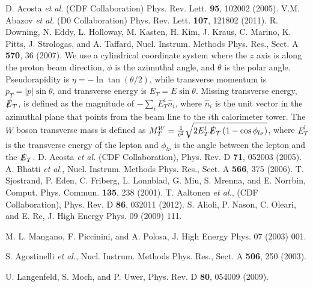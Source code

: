 \documentclass[aps,prd,twocolumn,superscriptaddress,showpacs]{revtex4}
\begin{document}
\begin{thebibliography}{150}
 D. Acosta {\it et al.} (CDF Collaboration) Phys. Rev. Lett. \textbf{95}, 102002 (2005). 
 V.M. Abazov {\it et al.} (D0 Collaboration) Phys. Rev. Lett. \textbf{107}, 121802 (2011). 
 R. Downing, N. Eddy, L. Holloway, M. Kasten, H. Kim, J. Kraus, C. Marino, K. Pitts, J. Strologas, and 
A. Taffard, Nucl. Instrum. Methods  Phys. Res., Sect. A  {\bf 570}, 36 (2007).
 We use a cylindrical coordinate system 
where the $z$ axis is along the proton beam direction, $\phi$ is the azimuthal angle, and 
$\theta$ is the polar angle. Pseudorapidity is $\eta = -\ln\tan(\theta/2)$, 
while transverse momentum is $p_{T}=\left|p\right|\sin\theta$, and transverse energy is $E_{T}=E\sin\theta$. 
Missing transverse energy, $\slashed{E}_{T}$, is defined as the magnitude of $-\sum_{i}E_{T}^{i}\hat{n}_{i}$, 
where $\hat{n}_{i}$ is the unit vector in the azimuthal plane 
that points from the beam line to the $i$th calorimeter tower.
The $W$ boson transverse mass is defined as
$M_{T}^{W} = \frac{1}{c^{2}}\sqrt{2 E_{T}^{l}\slashed E_{T}\left(1-\cos\phi_{l\nu}\right)}$,
where $E_{T}^{l}$ is the transverse energy of the lepton and $\phi_{l\nu}$ is the angle between the lepton and the $\slashed E_{T}$.
 D. Acosta {\it et al.} (CDF Collaboration), Phys. Rev. D  \textbf{71}, 052003 (2005).
 A. Bhatti {\it et al.}, Nucl. Instrum. Methods  Phys. Res., Sect. A {\bf 566}, 375 (2006).
 T. Sjostrand, P. Eden, C. Friberg, L. Lonnblad, G. Miu, S. Mrenna, and E. Norrbin,           
                     Comput. Phys. Commun. \textbf{135}, 238 (2001).
 T. Aaltonen {\it et al.}, (CDF Collaboration), Phys. Rev. D \textbf{86},  032011 (2012).
 S. Alioli, P. Nason, C. Oleari, and E. Re, J. High Energy Phys. 09 (2009) 111. 

 M. L. Mangano, F. Piccinini, and A. Polosa, J. High Energy Phys. 07 (2003) 001.

 S. Agostinelli {\it et al.}, Nucl. Instrum. Methods Phys. Res., Sect. A  {\bf 506}, 250 (2003).

  U. Langenfeld, S. Moch, and P. Uwer, Phys. Rev. D  \textbf{80}, 054009 (2009).


\end{thebibliography}
\end{document}
